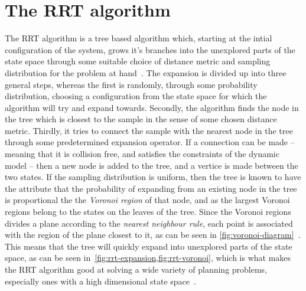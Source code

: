 \section{The RRT algorithm}
\label{sec:rrt-algorithm-intro}

The \ac{RRT} algorithm is a tree based algorithm which, starting at the intial
configuration of the system, grows it's branches into the unexplored parts of
the state space through some suitable choice of distance metric and sampling
distribution for the problem at hand~\cite{article}. The expansion is divided up
into three general steps, whereas the first is randomly, through some
probability distribution, choosing a configuration from the state space for
which the algorithm will try and expand towards. Secondly, the algorithm finds
the node in the tree which is closest to the sample in the sense of some chosen
distance metric. Thirdly, it tries to connect the sample with the nearest node
in the tree through some predetermined expansion operator. If a connection can
be made -- meaning that it is collision free, and satisfies the constraints of
the dynamic model -- then a new node is added to the tree, and a vertice is made
between the two states. If the sampling distribution is uniform, then the tree
is known to have the attribute that the probability of expanding from an
existing node in the tree is proportional the the \textit{Voronoi region} of
that node, and as the largest Voronoi regions belong to the states on the leaves
of the tree. Since the Voronoi regions divides a plane according to the
\textit{nearest neighbour rule}, each point is associated with the region of the
plane closest to it, as can be seen in
\cref{fig:voronoi-diagram}~\cite{aurenhammerVoronoiDiagramsSurvey1991}. This
means that the tree will quickly expand into unexplored parts of the state
space, as can be seen in~\cref{fig:rrt-expansion,fig:rrt-voronoi}, which is what
makes the \ac{RRT} algorithm good at solving a wide variety of planning
problems, especially ones with a high dimensional state space~\cite{Lav06}.

\begin{figure}
  \centering 
\end{figure}

